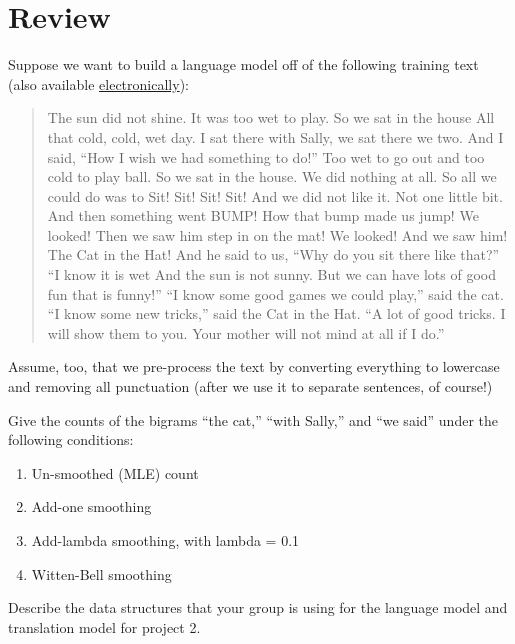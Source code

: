 \documentclass[11pt,letterpaper,boxed]{hmcpset}
\begin{document}
\section*{Review} 
Suppose we want to build a language model off of the following training
text (also available \href{https://cs.hmc.edu/courses/2015/spring/cs159/resources/catHat.txt}{electronically}): 

\begin{quote}
The sun did not shine. It was too wet to play. So we sat in the house All that cold, cold, wet day. I sat there with Sally, we sat there we two. And I said, ``How I wish we had something to do!'' Too wet to go out and too cold to play ball. So we sat in the house. We did nothing at all. So all we could do was to Sit! Sit! Sit! Sit! And we did not like it. Not one little bit. And then something went BUMP! How that bump made us jump! We looked! Then we saw him step in on the mat! We looked! And we saw him! The Cat in the Hat! And he said to us, ``Why do you sit there like that?'' ``I know it is wet And the sun is not sunny. But we can have lots of good fun that is funny!'' ``I know some good games we could play,'' said the cat. ``I know some new tricks,'' said the Cat in the Hat. ``A lot of good tricks. I will show them to you. Your mother will not mind at all if I do.''
\end{quote}

Assume, too, that we pre-process the text by converting everything to
lowercase and removing all punctuation (after we use it to separate
sentences, of course!) 

\begin{problem} 
Give the counts of the bigrams ``the cat,''
``with Sally,'' and ``we said'' under the following conditions:
\begin{enumerate}
    \item Un-smoothed (MLE) count
    \item Add-one smoothing
    \item Add-lambda smoothing, with lambda = 0.1
    \item Witten-Bell smoothing
\end{enumerate}
\end{problem}

\begin{solution}
\vspace{5cm}
\end{solution}
 
\begin{problem}
Describe the data structures that your group is using for the language
model and translation model for project 2.
\end{problem}
\begin{solution}
\vspace{6cm}
\end{solution}
\end{document}
